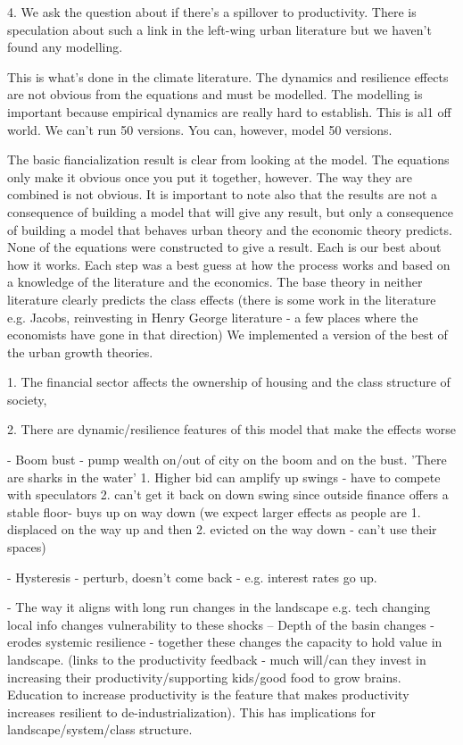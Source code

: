 4.  We ask the question about if there's a spillover to productivity. There is speculation about such a link in the left-wing urban literature but we haven't found any modelling.

This is what's done in the climate literature. The dynamics and resilience effects are not obvious from the equations and must be modelled. The modelling is important because empirical dynamics are really hard to establish. This is al1 off world. We can't run 50 versions. You can, however, model 50 versions. 

The basic fiancialization result is clear from looking at the model. The equations only make it obvious once you put it together, however. The way they are combined is not obvious.  It is important to note also that the results are not a consequence of building a model that will give any result, but only a consequence of building a model that behaves urban theory and the economic theory predicts. None of the equations were constructed to give a result. Each is our best about how it works. Each step was a best guess at how the process works and based on a knowledge of the literature and the economics. The base theory in neither literature clearly predicts the class effects (there is some work in the literature e.g. Jacobs, reinvesting in Henry George literature - a few places where the economists have gone in that direction) We implemented a version of the best of the urban growth theories.


1. The financial sector affects the ownership of housing and the class structure of society, 

2. There are dynamic/resilience features of this model that make the effects worse

- Boom bust - pump wealth on/out of city on the boom and on the bust. 'There are sharks in the water' 1. Higher bid can amplify up swings - have to compete with speculators 2. can't get it back on down swing since outside finance offers a stable floor- buys up on way down (we expect larger effects as people are 1. displaced on the way up and then 2. evicted on the way down - can't use their spaces)

- Hysteresis - perturb, doesn't come back - e.g. interest rates go up.

- The way it aligns with long run changes in the landscape e.g. tech changing local info changes vulnerability to these shocks -- Depth of the basin changes - erodes systemic resilience - together these changes the capacity to hold value in landscape. (links to the productivity feedback - much will/can they invest in increasing their productivity/supporting kids/good food to grow brains. Education to increase productivity is the feature that makes productivity increases resilient to de-industrialization). This has implications for landscape/system/class structure.

